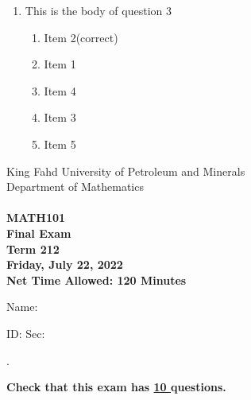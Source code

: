 \documentclass[amsfonts,bezier,leqno,fleqn,12pt,a4paper]{article}
\begin{document}
{\begin{large}
\begin{enumerate}
\begin{enumerate}
\end{enumerate}

\vspace {3.5cm}


\item This is the body of question 3
\vspace {0.3in}
\setcounter{equation}{0}

\begin{enumerate}
\item  Item 2\hfill {\small (correct)}
\item  Item 1
\item  Item 4
\item  Item 3
\item  Item 5

\end{enumerate}
\newpage


\end{enumerate}
\end{large}


\newpage


\thispagestyle{empty}
\begin{center}
    \begin{large}
        King Fahd University of Petroleum and Minerals \\ 
        Department of Mathematics  \\ 
        \vspace*{4.5cm}
        {\bf {} }  \hfill {\bf {}} \\
        {\bf MATH101 }  \\
        {\bf Final Exam }  \\
        {\bf Term 212 }  \\
        {\bf Friday, July 22, 2022 }  \\ 
        {\bf Net Time Allowed: 120 Minutes }  \\
        \vspace*{0.2cm}

    \end{large}
\end{center}

\large{Name:  }\hrulefill

\vspace{3mm}

\large{ID: } \hrulefill \large{  Sec: } \hrulefill \large{.

\vspace{1cm}

\large{\bf{Check that this exam has {\underline{ 10 }} questions.}}

\vspace{1cm}

}}
\end{document}
